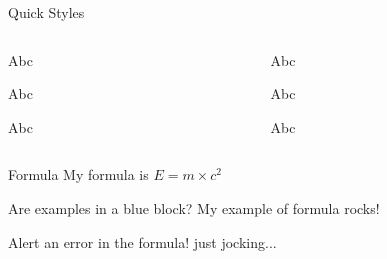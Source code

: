 \documentclass{beamer}
\begin{document}
\begin{frame}{Quick Styles}
\begin{columns}
    \begin{column}{0.12\paperwidth}
    \begin{yellow0block}{Abc}
    \end{yellow0block}
    \begin{yellow1block}{Abc}
    \end{yellow1block}
    \begin{yellow2block}{Abc}
    \end{yellow2block}
    \end{column}

    \begin{column}{0.12\paperwidth}
    \begin{red0block}{Abc}
    \end{red0block}
    \begin{red1block}{Abc}
    \end{red1block}
    \begin{red2block}{Abc}
    \end{red2block}
    \end{column}

\end{columns}
\end{frame}

\begin{frame}{Formula}
    My formula is $E=m\times c^2$
    \begin{blue2block}{Are examples in a blue block?}
        My example of formula rocks!
    \end{blue2block}

    \begin{red2block}{Alert an error in the formula!}
        just jocking...
    \end{red2block}
\end{frame}

\end{document}
